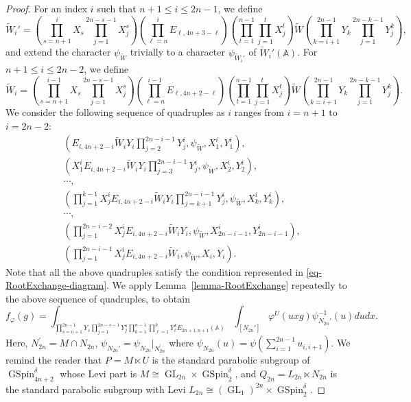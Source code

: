 \documentclass[12pt]{amsart}
\newcommand{\A}{\mathbb{A}}
\newcommand{\wt}{\widetilde}
\theoremstyle{remark}
\DeclareMathOperator{\GL}{GL}
\DeclareMathOperator{\GSpin}{GSpin}
\begin{document}
\begin{proof}
For an index $i$ such that $n+1\le i \le 2n-1$, we define
\begin{equation}\label{eq-prop-nonvanishing-eq12}
\wt{W}_{i}' = \left( \prod_{s=n+1}^{i} X_s \prod_{j=1}^{2n-s-1} X^s_j \right)  \left( \prod_{\ell=n}^{i} E_{\ell, 4n+3-\ell}\right) 
\left( \prod_{t=1}^{n-1} \prod_{j=1}^{t} X^t_j \right) \wt{W} \left( \prod_{k=i+1}^{2n-1} Y_k \prod_{j=1}^{2n-k-1} Y^k_j\right),
\end{equation}
and extend the character $\psi_{\wt{W}}$ trivially to a character $\psi_{\wt{W}_{i}'}$ of $\wt{W}_{i}'(\A)$. 
For $n+1\le i \le 2n-2$, we define
\begin{equation*}
	\wt{W}_i = \left( \prod_{s=n+1}^{i-1} X_s \prod_{j=1}^{2n-s-1} X^s_j \right) \left( \prod_{\ell=n}^{i-1} E_{\ell,4n+2-\ell} \right)
\left( \prod_{t=1}^{n-1} \prod_{j=1}^{t} X^t_j \right)\wt{W} \left( \prod_{k=i+1}^{2n-1} Y_k \prod_{j=1}^{2n-k-1} Y^k_j\right).
\end{equation*}
We consider the following sequence of quadruples as $i$ ranges from $i=n+1$ to $i=2n-2$:
\begin{align*}
& (E_{i,4n+2-i}\wt{W}_i Y_i \prod_{j=2}^{2n-i-1} Y^i_j, \psi_{\wt{W}}, X^i_1, Y^i_1),\\
& (X^i_1 E_{i,4n+2-i}\wt{W}_i Y_i \prod_{j=3}^{2n-i-1} Y^i_j, \psi_{\wt{W}}, X^i_2, Y^i_2),\\
& \cdots,\\
& (\prod_{j=1}^{k-1} X^i_jE_{i,4n+2-i}\wt{W}_i Y_i  \prod_{j=k+1}^{2n-i-1} Y^i_j, \psi_{\wt{W}}, X^i_k, Y^i_k),\\
& \cdots,\\
& (\prod_{j=1}^{2n-i-2} X^i_j E_{i,4n+2-i}\wt{W}_i Y_i , \psi_{\wt{W}}, X^i_{2n-i-1}, Y^i_{2n-i-1}),\\
& (\prod_{j=1}^{2n-i-1} X^i_j E_{i,4n+2-i} \wt{W}_i, \psi_{\wt{W}}, X_i, Y_i).
\end{align*}
Note that all the above quadruples satisfy the condition represented in \eqref{eq-RootExchange-diagram}. 
We apply Lemma~\ref{lemma-RootExchange} repeatedly to the above sequence of quadruples, to obtain
\begin{equation}\label{eq-prop-nonvanishing-eq13}
f_{\varphi}(g)=\int_{\prod_{s=n+1}^{2n-1} Y_s \prod_{j=1}^{2n-s-1} Y^s_j\prod_{k=1}^{n-1} \prod_{\ell=1}^k Y^k_{\ell}
E_{2n+1,n+1}
(\A)}\int_{[N_{2n}']} \varphi^U(uxg) \psi^{-1}_{N_{2n}'}(u) dudx.
\end{equation}
Here, $N_{2n}^\prime=M\cap N_{2n}$, $\psi_{N_{2n}'}=\psi_{N_{2n}}|_{N_{2n}^\prime}$ where $\psi_{N_{2n}}(u)=\psi(\sum_{i=1}^{2n-1} u_{i,i+1})$. We remind the reader that $P=M\ltimes U$ is the standard parabolic subgroup of $\GSpin_{4n+2}^\delta$ whose Levi part is $M\cong \GL_{2n}\times \GSpin_2^\delta$, and $Q_{2n}=L_{2n}\ltimes N_{2n}$ is the standard parabolic subgroup with Levi $L_{2n}\cong (\GL_1)^{2n}\times \GSpin_2^\delta$. 
 

\end{proof}
\end{document}
